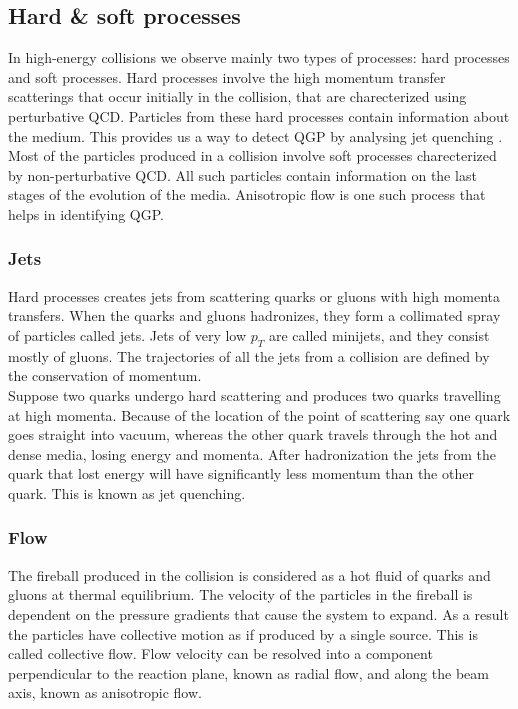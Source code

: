 \documentclass[12pt,a4paper,twoside]{report}
\begin{document}
\subsection{Hard \& soft processes}
In high-energy collisions we observe mainly two types of processes: hard processes and soft processes. Hard processes involve the high momentum transfer scatterings that occur initially in the collision, that are charecterized using perturbative QCD. Particles from these hard processes contain information about the medium. This provides us a way to detect QGP by analysing jet quenching \cite{Ref:jetQ-paper3}. Most of the particles produced in a collision involve soft processes charecterized by non-perturbative QCD. All such particles contain information on the last stages of the evolution of the media. Anisotropic flow is one such process that helps in identifying QGP.
\subsubsection{Jets}
Hard processes creates jets from scattering quarks or gluons with high momenta transfers. When the quarks and gluons hadronizes, they form a collimated spray of particles called jets. Jets of very low $p_T$ are called minijets, and they consist mostly of gluons. The trajectories of all the jets from a collision are defined by the conservation of momentum.\\
Suppose two quarks undergo hard scattering and produces two quarks travelling at high momenta. Because of the location of the point of scattering say one quark goes straight into vacuum, whereas the other quark travels through the hot and dense media, losing energy and momenta. After hadronization the jets from the quark that lost energy will have significantly less momentum than the other quark. This is known as jet quenching.
\subsubsection{Flow}
The fireball produced in the collision is considered as a hot fluid of quarks and gluons at thermal equilibrium. The velocity of the particles in the fireball is dependent on the pressure gradients that cause the system to expand. As a result the particles have collective motion as if produced by a single source. This is called collective flow. Flow velocity can be resolved into a component perpendicular to the reaction plane, known as radial flow, and along the beam axis, known as anisotropic flow.
\end{document}
